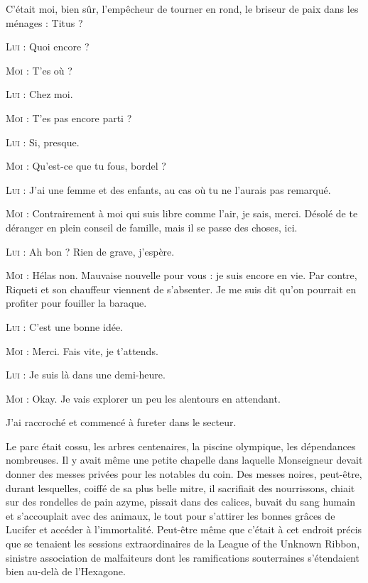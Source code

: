 \begin{dialogue}

C’était moi, bien sûr, l’empêcheur de tourner en rond, le briseur de paix dans les ménages : Titus ?

\textsc{Lui} : Quoi encore ?

\textsc{Moi} : T’es où ?

\textsc{Lui} : Chez moi.

\textsc{Moi} : T’es pas encore parti ?

\textsc{Lui} : Si, presque.

\textsc{Moi} : Qu’est-ce que tu fous, bordel ?

\textsc{Lui} : J’ai une femme et des enfants, au cas où tu ne l’aurais pas remarqué.

\textsc{Moi} : Contrairement à moi qui suis libre comme l’air, je sais, merci. Désolé de te déranger en plein conseil de famille, mais il se passe des choses, ici.

\textsc{Lui} : Ah bon ? Rien de grave, j’espère.

\textsc{Moi} : Hélas non. Mauvaise nouvelle pour vous : je suis encore en vie. Par contre, Riqueti et son chauffeur viennent de s’absenter. Je me suis dit qu’on pourrait en profiter pour fouiller la baraque.

\textsc{Lui} : C’est une bonne idée.

\textsc{Moi} : Merci. Fais vite, je t’attends.

\textsc{Lui} : Je suis là dans une demi-heure.

\textsc{Moi} : Okay. Je vais explorer un peu les alentours en attendant.

\end{dialogue}

J’ai raccroché et commencé à fureter dans le secteur.

Le parc était cossu, les arbres centenaires, la piscine olympique, les dépendances nombreuses. Il y avait même une petite chapelle dans laquelle Monseigneur devait donner des messes privées pour les notables du coin. Des messes noires, peut-être, durant lesquelles, coiffé de sa plus belle mitre, il sacrifiait des nourrissons, chiait sur des rondelles de pain azyme, pissait dans des calices, buvait du sang humain et s’accouplait avec des animaux, le tout pour s’attirer les bonnes grâces de Lucifer et accéder à l’immortalité. Peut-être même que c’était à cet endroit précis que se tenaient les sessions extraordinaires de la League of the Unknown Ribbon, sinistre association de malfaiteurs dont les ramifications souterraines s’étendaient bien au-delà de l’Hexagone.

